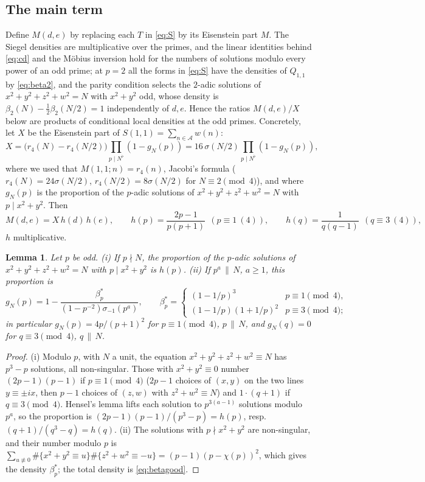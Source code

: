 \documentclass[11pt]{amsart}
\newtheorem{lemma}[theorem]{Lemma}
\theoremstyle{remark}
\newcommand{\cA}{\mathcal{A}}
\begin{document}
\subsection{The main term}
Define $M(d,e)$ by replacing each $T$ in \eqref{eq:S} by its Eisenstein part $M$. The Siegel densities are multiplicative over the primes, and the linear identities behind \eqref{eq:cd} and the M\"obius inversion hold for the numbers of solutions modulo every power of an odd prime; at $p=2$ all the forms in \eqref{eq:S} have the densities of $Q_{1,1}$ by \eqref{eq:beta2}, and the parity condition selects the $2$-adic solutions of $x^2+y^2+z^2+w^2=N$ with $x^2+y^2$ odd, whose density is $\beta_2(N)-\frac12\beta_2(N/2)=1$ independently of $d,e$. Hence the ratios $M(d,e)/X$ below are products of conditional local densities at the odd primes. Concretely, let $X$ be the Eisenstein part of $S(1,1)=\sum_{n\in\cA}w(n)$:
\begin{equation}\label{eq:X}
X=\bigl(r_4(N)-r_4(N/2)\bigr)\prod_{p\mid N^\flat}(1-g_N(p))=16\,\sigma(N/2)\prod_{p\mid N^\flat}(1-g_N(p)),
\end{equation}
where we used that $M(1,1;n)=r_4(n)$, Jacobi's formula ($r_4(N)=24\sigma(N/2)$, $r_4(N/2)=8\sigma(N/2)$ for $N\equiv 2\pmod 4$), and where $g_N(p)$ is the proportion of the $p$-adic solutions of $x^2+y^2+z^2+w^2=N$ with $p\mid x^2+y^2$. Then
\begin{equation}\label{eq:Mde}
M(d,e)=X\,h(d)\,h(e),\qquad h(p)=\frac{2p-1}{p(p+1)}\ \ (p\equiv1\ (4)),\qquad h(q)=\frac1{q(q-1)}\ \ (q\equiv 3\ (4)),
\end{equation}
$h$ multiplicative.

\begin{lemma}\label{lem:densities}
Let $p$ be odd. (i) If $p\nmid N$, the proportion of the $p$-adic solutions of $x^2+y^2+z^2+w^2=N$ with $p\mid x^2+y^2$ is $h(p)$. (ii) If $p^a\,\|\,N$, $a\ge1$, this proportion is
\[
g_N(p)=1-\frac{\beta_p^*}{(1-p^{-2})\sigma_{-1}(p^a)},\qquad
\beta_p^*=\begin{cases}(1-1/p)^3 & p\equiv1\pmod 4,\\ (1-1/p)(1+1/p)^2 & p\equiv3\pmod4;\end{cases}
\]
in particular $g_N(p)=4p/(p+1)^2$ for $p\equiv1\pmod 4$, $p\,\|\,N$, and $g_N(q)=0$ for $q\equiv3\pmod4$, $q\,\|\,N$.
\end{lemma}
\begin{proof}
(i) Modulo $p$, with $N$ a unit, the equation $x^2+y^2+z^2+w^2\equiv N$ has $p^3-p$ solutions, all non-singular. Those with $x^2+y^2\equiv0$ number $(2p-1)(p-1)$ if $p\equiv1\pmod4$ ($2p-1$ choices of $(x,y)$ on the two lines $y\equiv\pm ix$, then $p-1$ choices of $(z,w)$ with $z^2+w^2\equiv N$) and $1\cdot(q+1)$ if $q\equiv3\pmod 4$. Hensel's lemma lifts each solution to $p^{3(a-1)}$ solutions modulo $p^a$, so the proportion is $(2p-1)(p-1)/(p^3-p)=h(p)$, resp.\ $(q+1)/(q^3-q)=h(q)$. (ii) The solutions with $p\nmid x^2+y^2$ are non-singular, and their number modulo $p$ is $\sum_{u\not\equiv0}\#\{x^2+y^2\equiv u\}\#\{z^2+w^2\equiv -u\}=(p-1)(p-\chi(p))^2$, which gives the density $\beta_p^*$; the total density is \eqref{eq:betagood}.
\end{proof}
\end{document}
